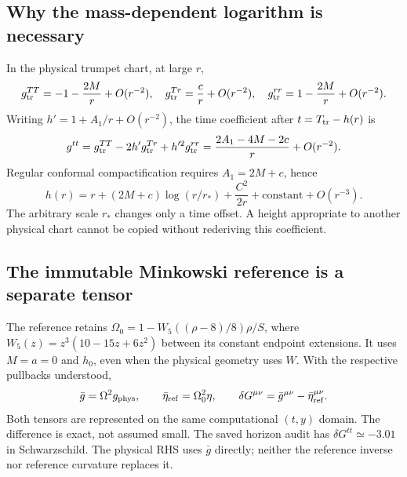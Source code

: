 \documentclass[11pt,letterpaper]{article}
\newcommand{\G}{\bar g}
\begin{document}
\subsection{Why the mass-dependent logarithm is necessary}
In the physical trumpet chart, at large $r$,
\begin{equation}
 g^{TT}_{\rm tr}=-1-\frac{2M}{r}+O(r^{-2}),\quad
 g^{Tr}_{\rm tr}=\frac{c}{r}+O(r^{-2}),\quad
 g^{rr}_{\rm tr}=1-\frac{2M}{r}+O(r^{-2}).
\end{equation}
Writing $h'=1+A_1/r+O(r^{-2})$, the time coefficient after $t=T_{\rm tr}-h(r)$ is
\begin{equation}
 g^{tt}=g^{TT}_{\rm tr}-2h'g^{Tr}_{\rm tr}+h'^2g^{rr}_{\rm tr}
 =\frac{2A_1-4M-2c}{r}+O(r^{-2}).
\end{equation}
Regular conformal compactification requires $A_1=2M+c$, hence
\begin{equation}
 h(r)=r+(2M+c)\log(r/r_*)+\frac{C^2}{2r}+\text{constant}+O(r^{-3}).
\end{equation}
The arbitrary scale $r_*$ changes only a time offset. A height appropriate to another physical chart cannot be copied without rederiving this coefficient.

\subsection{The immutable Minkowski reference is a separate tensor}
The reference retains $\Omega_0=1-W_5((\rho-8)/8)\rho/S$, where
$W_5(z)=z^3(10-15z+6z^2)$ between its constant endpoint extensions. It uses $M=a=0$ and $h_0$, even when the physical geometry uses $W$. With the respective pullbacks understood,
\begin{equation}
 \G=\Omega^2g_{\rm phys},\qquad
 \bar\eta_{\rm ref}=\Omega_0^2\eta,\qquad
 \delta G^{\mu\nu}=\G^{\mu\nu}-\bar\eta_{\rm ref}^{\mu\nu}.
\end{equation}
Both tensors are represented on the same computational $(t,y)$ domain. The difference is exact, not assumed small. The saved horizon audit has $\delta G^{tt}\simeq-3.01$ in Schwarzschild. The physical RHS uses $\G$ directly; neither the reference inverse nor reference curvature replaces it.

\clearpage
\end{document}
